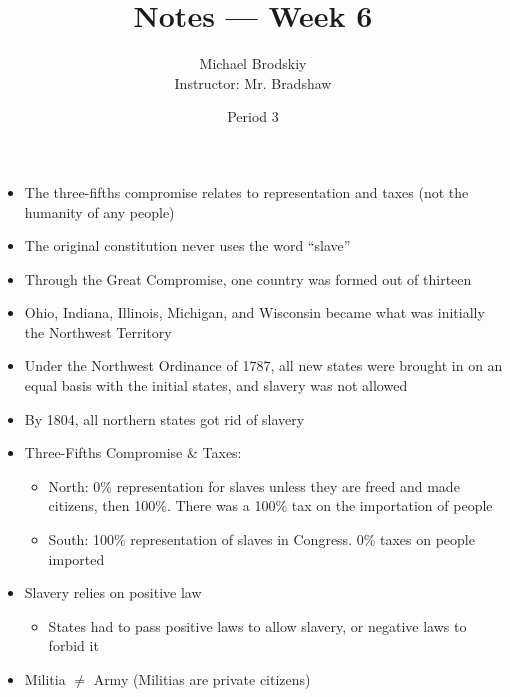 \documentclass[12pt]{article}
\title{Notes — Week 6}
\date{Period 3}
\author{Michael Brodskiy\\ \small Instructor: Mr. Bradshaw}
\begin{document}
\maketitle

\begin{itemize}

  \item The three-fifths compromise relates to representation and taxes (not the humanity of any people)

  \item The original constitution never uses the word “slave”

  \item Through the Great Compromise, one country was formed out of thirteen
    
  \item Ohio, Indiana, Illinois, Michigan, and Wisconsin became what was initially the Northwest Territory

  \item Under the Northwest Ordinance of 1787, all new states were brought in on an equal basis with the initial states, and slavery was not allowed

  \item By 1804, all northern states got rid of slavery

  \item Three-Fifths Compromise \& Taxes:

    \begin{itemize}
        
      \item North: 0\% representation for slaves unless they are freed and made citizens, then 100\%. There was a 100\% tax on the importation of people

      \item South: 100\% representation of slaves in Congress. 0\% taxes on people imported

    \end{itemize}

  \item Slavery relies on positive law

    \begin{itemize}

      \item States had to pass positive laws to allow slavery, or negative laws to forbid it

    \end{itemize}

  \item Militia $\neq$ Army (Militias are private citizens)


\end{itemize}
\end{document}
